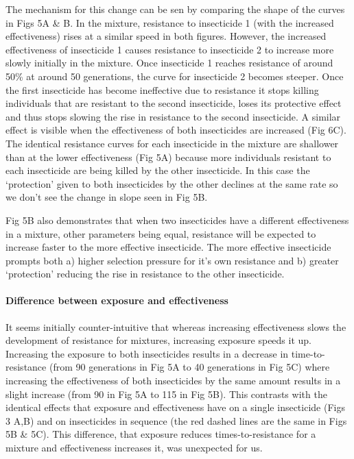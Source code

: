 \documentclass[11pt,]{article}
\let\oldparagraph\paragraph
\renewcommand{\paragraph}[1]{\oldparagraph{#1}\mbox{}}
\begin{document}
The mechanism for this change can be sen by comparing the shape of the
curves in Figs 5A \& B. In the mixture, resistance to insecticide 1
(with the increased effectiveness) rises at a similar speed in both
figures. However, the increased effectiveness of insecticide 1 causes
resistance to insecticide 2 to increase more slowly initially in the
mixture. Once insecticide 1 reaches resistance of around 50\% at around
50 generations, the curve for insecticide 2 becomes steeper. Once the
first insecticide has become ineffective due to resistance it stops
killing individuals that are resistant to the second insecticide, loses
its protective effect and thus stops slowing the rise in resistance to
the second insecticide. A similar effect is visible when the
effectiveness of both insecticides are increased (Fig 6C). The identical
resistance curves for each insecticide in the mixture are shallower than
at the lower effectiveness (Fig 5A) because more individuals resistant
to each insecticide are being killed by the other insecticide. In this
case the `protection' given to both insecticides by the other declines
at the same rate so we don't see the change in slope seen in Fig 5B.

Fig 5B also demonstrates that when two insecticides have a different
effectiveness in a mixture, other parameters being equal, resistance
will be expected to increase faster to the more effective insecticide.
The more effective insecticide prompts both a) higher selection pressure
for it's own resistance and b) greater `protection' reducing the rise in
resistance to the other insecticide.

\paragraph{Difference between exposure and
effectiveness}\label{difference-between-exposure-and-effectiveness}

It seems initially counter-intuitive that whereas increasing
effectiveness slows the development of resistance for mixtures,
increasing exposure speeds it up. Increasing the exposure to both
insecticides results in a decrease in time-to-resistance (from 90
generations in Fig 5A to 40 generations in Fig 5C) where increasing the
effectiveness of both insecticides by the same amount results in a
slight increase (from 90 in Fig 5A to 115 in Fig 5B). This contrasts
with the identical effects that exposure and effectiveness have on a
single insecticide (Figs 3 A,B) and on insecticides in sequence (the red
dashed lines are the same in Figs 5B \& 5C). This difference, that
exposure reduces times-to-resistance for a mixture and effectiveness
increases it, was unexpected for us.
\end{document}
